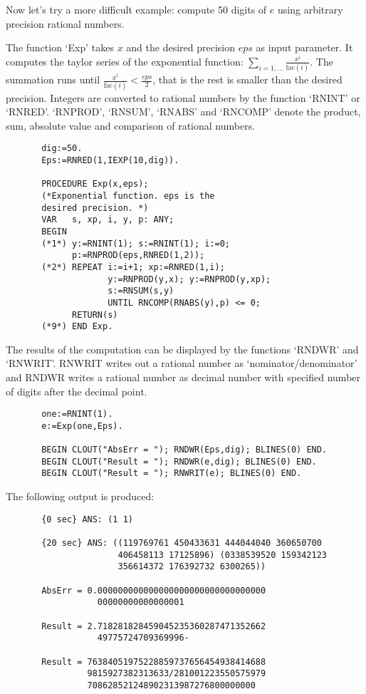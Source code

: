Now let's try a more difficult example:  
compute 50 digits of $e$ using 
arbitrary precision rational numbers. 

The function `Exp' takes $x$ and the desired precision $eps$ as 
input parameter. It computes the taylor series of the 
exponential function: 
$\sum_{i=1,\ldots} \frac{x^i}{\mbox{fac}(i)}$.
The summation runs  
until $\frac{x^i}{\mbox{fac}(i)} < \frac{eps}{2}$,
that is the rest is smaller than the desired precision.
Integers are converted to rational numbers 
by the function `RNINT' or `RNRED'.
`RNPROD', `RNSUM', `RNABS' and `RNCOMP' denote the
product, sum, absolute value and comparison of 
rational numbers.

\begin{verbatim}
       dig:=50.
       Eps:=RNRED(1,IEXP(10,dig)). 

       PROCEDURE Exp(x,eps);
       (*Exponential function. eps is the 
       desired precision. *)
       VAR   s, xp, i, y, p: ANY;
       BEGIN 
       (*1*) y:=RNINT(1); s:=RNINT(1); i:=0; 
             p:=RNPROD(eps,RNRED(1,2));
       (*2*) REPEAT i:=i+1; xp:=RNRED(1,i);
                    y:=RNPROD(y,x); y:=RNPROD(y,xp);
                    s:=RNSUM(s,y)
                    UNTIL RNCOMP(RNABS(y),p) <= 0;
             RETURN(s)
       (*9*) END Exp.
\end{verbatim}

The results of the computation can be displayed by the 
functions `RNDWR' and `RNWRIT'.
RNWRIT writes out a rational 
number as `nominator/denominator' and
RNDWR writes a rational  
number as decimal number with
specified number of digits after the decimal point.

\begin{verbatim}
       one:=RNINT(1).
       e:=Exp(one,Eps).

       BEGIN CLOUT("AbsErr = "); RNDWR(Eps,dig); BLINES(0) END. 
       BEGIN CLOUT("Result = "); RNDWR(e,dig); BLINES(0) END. 
       BEGIN CLOUT("Result = "); RNWRIT(e); BLINES(0) END. 
\end{verbatim}

The following output is produced:

\begin{verbatim}
       {0 sec} ANS: (1 1)
 
       {20 sec} ANS: ((119769761 450433631 444044040 360650700 
                      406458113 17125896) (0338539520 159342123 
                      356614372 176392732 6300265))
 
       AbsErr = 0.000000000000000000000000000000000
                  00000000000000001
 
       Result = 2.718281828459045235360287471352662
                  49775724709369996-
 
       Result = 76384051975228859737656454938414688
                9815927382313633/281001223550575979
                708628521248902313987276800000000
\end{verbatim}

